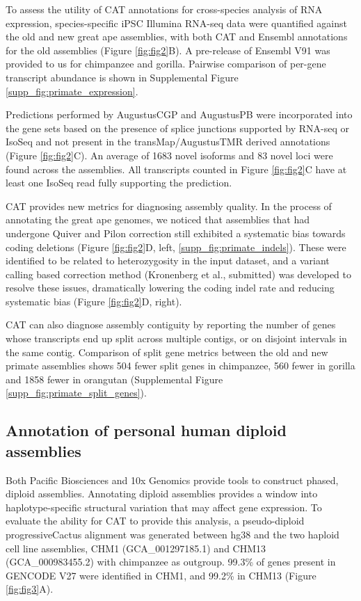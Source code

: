 \documentclass[fleqn,10pt]{wlscirep}
\begin{document}
To assess the utility of CAT annotations for cross-species analysis of RNA expression, species-specific iPSC Illumina RNA-seq data were quantified against the old and new great ape assemblies, with both CAT and Ensembl annotations for the old assemblies (Figure \ref{fig:fig2}B). A pre-release of Ensembl V91 was provided to us for chimpanzee and gorilla. Pairwise comparison of per-gene transcript abundance is shown in Supplemental Figure \ref{supp_fig:primate_expression}. 

Predictions performed by AugustusCGP and AugustusPB were incorporated into the gene sets based on the presence of splice junctions supported by RNA-seq or IsoSeq and not present in the transMap/AugustusTMR derived annotations (Figure \ref{fig:fig2}C). An average of 1683 novel isoforms and 83 novel loci were found across the assemblies. All transcripts counted in Figure \ref{fig:fig2}C have at least one IsoSeq read fully supporting the prediction.

CAT provides new metrics for diagnosing assembly quality. In the process of annotating the great ape genomes, we noticed that assemblies that had undergone Quiver and Pilon \cite{walker2014pilon} correction still exhibited a systematic bias towards coding deletions (Figure \ref{fig:fig2}D, left, \ref{supp_fig:primate_indels}). These were identified to be related to heterozygosity in the input dataset, and a variant calling based correction method (Kronenberg et al., submitted) was developed to resolve these issues, dramatically lowering the coding indel rate and reducing systematic bias (Figure \ref{fig:fig2}D, right). 

CAT can also diagnose assembly contiguity by reporting the number of genes whose transcripts end up split across multiple contigs, or on disjoint intervals in the same contig. Comparison of split gene metrics between the old and new primate assemblies shows 504 fewer split genes in chimpanzee, 560 fewer in gorilla and 1858 fewer in orangutan (Supplemental Figure \ref{supp_fig:primate_split_genes}).


\subsection*{Annotation of personal human diploid assemblies}
Both Pacific Biosciences \cite{chin2016phased,huddleston2016discovery} and 10x Genomics \cite{Weisenfeld070425} provide tools to construct phased, diploid assemblies. Annotating diploid assemblies provides a window into haplotype-specific structural variation that may affect gene expression. To evaluate the ability for CAT to provide this analysis, a pseudo-diploid progressiveCactus alignment was generated between hg38 and the two haploid cell line assemblies, CHM1 (GCA\_001297185.1) and CHM13 (GCA\_000983455.2) with chimpanzee as outgroup. 99.3\% of genes present in GENCODE V27 were identified in CHM1, and 99.2\% in CHM13 (Figure \ref{fig:fig3}A). 
    
\end{document}
